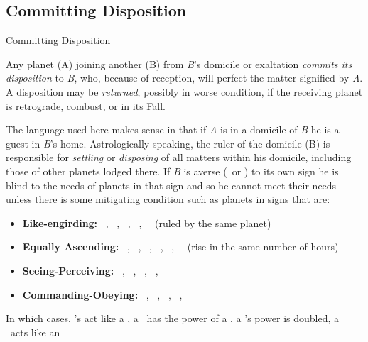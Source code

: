 \subsection{Committing Disposition}
\begin{frame}[t]{Committing Disposition}
\small
\begin{block}{}
Any planet (A) joining another (B) from \textsl{B}'s domicile or exaltation \textsl{commits its disposition} to \textsl{B}, who, because of reception, will perfect the matter signified by \textsl{A}. A disposition may be \textsl{returned}, possibly in worse condition, if the receiving planet is retrograde, combust, or in its Fall. 
\end{block}

The language used here makes sense in that if \textsl{A} is in a domicile of \textsl{B} he is a guest in \textsl{B}'s home. Astrologically speaking, the ruler of the domicile (B) is responsible for \textsl{settling} or \textsl{disposing} of all matters within his domicile, including those of other planets lodged there. If \textsl{B} is averse (\Semisextile\ or \Quincunx) to its own sign he is blind to the needs of planets in that sign and so he cannot meet their needs unless there is some mitigating condition such as planets in signs that are:

\begin{itemize}
\item \textbf{Like-engirding:}  \Aries\ \Scorpio, \Taurus\  \Libra, \Gemini\ \Virgo, \Sagittarius\ \Pisces,  \Capricorn\ \Aquarius\ (ruled by the same planet)

\item \textbf{Equally Ascending:}  \Aries\ \Pisces, \Taurus\ \Aquarius, \Gemini\ \Capricorn, \Cancer\ \Sagittarius, \Leo\ \Scorpio, \Virgo\ \Libra\ (rise in the same number of hours)

\item \textbf{Seeing-Perceiving:} \Aries\ \Libra, \Taurus\ \Virgo, \Gemini\ \Leo, \Scorpio\ \Pisces, \Sagittarius\ \Aquarius

\item \textbf{Commanding-Obeying:} \Taurus\ \Pisces, \Gemini\ \Aquarius, \Cancer\ \Capricorn, \Leo\ \Sagittarius, \Virgo\ \Scorpio
\end{itemize}
In which cases, \Semisextile's act like a \Conjunction, a \Sextile\ has the power of a \Trine, a \Square's power is doubled, a \Quincunx\ acts like an \Opposition
\end{frame}
